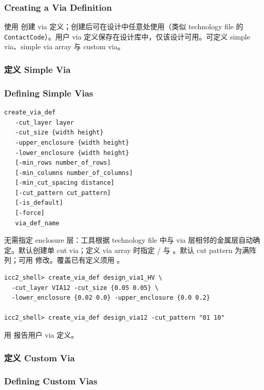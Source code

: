 \subsubsection*{Creating a Via Definition}

使用  创建 via 定义；创建后可在设计中任意处使用（类似 technology file 的 \texttt{ContactCode}）。用户 via 定义保存在设计库中，仅该设计可用。可定义 simple via、simple via array 与 custom via。

\subsubsection{定义 Simple Via}
\subsubsection*{Defining Simple Vias}

\begin{lstlisting}
create_via_def
   -cut_layer layer
   -cut_size {width height}
   -upper_enclosure {width height}
   -lower_enclosure {width height}
   [-min_rows number_of_rows]
   [-min_columns number_of_columns]
   [-min_cut_spacing distance]
   [-cut_pattern cut_pattern]
   [-is_default]
   [-force]
   via_def_name
\end{lstlisting}

无需指定 enclosure 层：工具根据 technology file 中与 via 层相邻的金属层自动确定。默认创建单 cut via；定义 via array 时指定 / 与 。默认 cut pattern 为满阵列；可用  修改。覆盖已有定义须用 。

\begin{lstlisting}
icc2_shell> create_via_def design_via1_HV \
  -cut_layer VIA12 -cut_size {0.05 0.05} \
  -lower_enclosure {0.02 0.0} -upper_enclosure {0.0 0.2}

icc2_shell> create_via_def design_via12 -cut_pattern "01 10"
\end{lstlisting}

用  报告用户 via 定义。

\subsubsection{定义 Custom Via}
\subsubsection*{Defining Custom Vias}

